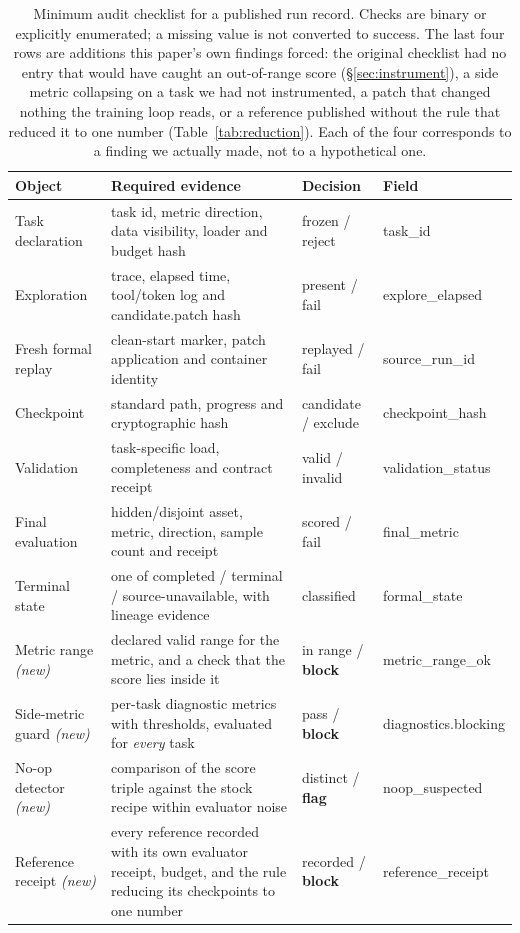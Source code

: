 \begin{table}[t]
\centering
\scriptsize
\setlength{\tabcolsep}{3pt}
\caption{Minimum audit checklist for a published run record. Checks are binary or explicitly
enumerated; a missing value is not converted to success. The last four rows are additions this
paper's own findings forced: the original checklist had no entry that would have caught an
out-of-range score (\S\ref{sec:instrument}), a side metric collapsing on a task we had not instrumented,
a patch that changed nothing the training loop reads, or a reference published without the rule
that reduced it to one number (Table~\ref{tab:reduction}). Each of the four corresponds to a
finding we actually made, not to a hypothetical one.}
\label{tab:audit}
\begin{tabular}{p{2.25cm}p{5.9cm}p{2.4cm}p{2.4cm}}
\toprule
Object & Required evidence & Decision & Field \\
\midrule
Task declaration & task id, metric direction, data visibility, loader and budget hash & frozen / reject & task\_id \\
Exploration & trace, elapsed time, tool/token log and candidate.patch hash & present / fail & explore\_elapsed \\
Fresh formal replay & clean-start marker, patch application and container identity & replayed / fail & source\_run\_id \\
Checkpoint & standard path, progress and cryptographic hash & candidate / exclude & checkpoint\_hash \\
Validation & task-specific load, completeness and contract receipt & valid / invalid & validation\_status \\
Final evaluation & hidden/disjoint asset, metric, direction, sample count and receipt & scored / fail & final\_metric \\
Terminal state & one of completed / terminal / source-unavailable, with lineage evidence & classified & formal\_state \\
\midrule
Metric range \emph{(new)} & declared valid range for the metric, and a check that the score lies inside it & in range / \textbf{block} & metric\_range\_ok \\
Side-metric guard \emph{(new)} & per-task diagnostic metrics with thresholds, evaluated for \emph{every} task & pass / \textbf{block} & diagnostics.blocking \\
No-op detector \emph{(new)} & comparison of the score triple against the stock recipe within evaluator noise & distinct / \textbf{flag} & noop\_suspected \\
Reference receipt \emph{(new)} & every reference recorded with its own evaluator receipt, budget, and the rule reducing its checkpoints to one number & recorded / \textbf{block} & reference\_receipt \\
\bottomrule
\end{tabular}
\end{table}
